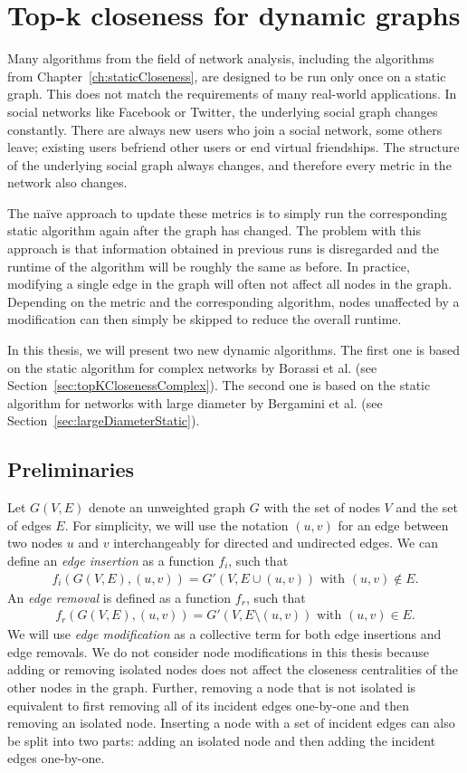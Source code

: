 \chapter{Top-k closeness for dynamic graphs}
\label{ch:dynamicCloseness}

Many algorithms from the field of network analysis, including the algorithms from Chapter~\ref{ch:staticCloseness}, are designed to be run only once on a static graph. This does not match the requirements of many real-world applications. In social networks like Facebook or Twitter, the underlying social graph changes constantly. There are always new users who join a social network, some others leave; existing users befriend other users or end virtual friendships. The structure of the underlying social graph always changes, and therefore every metric in the network also changes.

The na\"ive approach to update these metrics is to simply run the corresponding static algorithm again after the graph has changed. The problem with this approach is that information obtained in previous runs is disregarded and the runtime of the algorithm will be roughly the same as before. In practice, modifying a single edge in the graph will often not affect all nodes in the graph. Depending on the metric and the corresponding algorithm, nodes unaffected by a modification can then simply be skipped to reduce the overall runtime.

In this thesis, we will present two new dynamic algorithms. The first one is based on the static algorithm for complex networks by Borassi et al. (see Section~\ref{sec:topKClosenessComplex}). The second one is based on the static algorithm for networks with large diameter by Bergamini et al. (see Section~\ref{sec:largeDiameterStatic}).

\section{Preliminaries}
Let $G(V, E)$ denote an unweighted graph $G$ with the set of nodes $V$ and the set of edges $E$. For simplicity, we will use the notation $(u, v)$ for an edge between two nodes $u$ and $v$ interchangeably for directed and undirected edges. We can define an \emph{edge insertion} as a function $f_i$, such that
\begin{align}
	f_i(G(V, E), (u, v)) = G'(V, E \cup (u, v))\text{ with } (u, v) \notin E.
\end{align}
An \emph{edge removal} is defined as a function $f_r$, such that
\begin{align}
	f_r(G(V, E), (u, v)) = G'(V, E \setminus (u, v)) \text{ with } (u, v) \in E.
\end{align}
We will use \emph{edge modification} as a collective term for both edge insertions and edge removals. We do not consider node modifications in this thesis because adding or removing isolated nodes does not affect the closeness centralities of the other nodes in the graph. Further, removing a node that is not isolated is equivalent to first removing all of its incident edges one-by-one and then removing an isolated node. Inserting a node with a set of incident edges can also be split into two parts: adding an isolated node and then adding the incident edges one-by-one.

